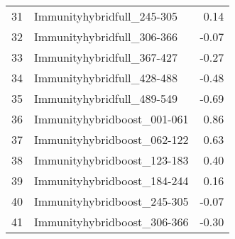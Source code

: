 \begin{table}[ht]
\begin{tabular}{rlr}
  31 & Immunityhybridfull\_245-305 & 0.14 \\ 
  32 & Immunityhybridfull\_306-366 & -0.07 \\ 
  33 & Immunityhybridfull\_367-427 & -0.27 \\ 
  34 & Immunityhybridfull\_428-488 & -0.48 \\ 
  35 & Immunityhybridfull\_489-549 & -0.69 \\ 
  36 & Immunityhybridboost\_001-061 & 0.86 \\ 
  37 & Immunityhybridboost\_062-122 & 0.63 \\ 
  38 & Immunityhybridboost\_123-183 & 0.40 \\ 
  39 & Immunityhybridboost\_184-244 & 0.16 \\ 
  40 & Immunityhybridboost\_245-305 & -0.07 \\ 
  41 & Immunityhybridboost\_306-366 & -0.30 \\ 
   \hline
\end{tabular}
\end{table}
